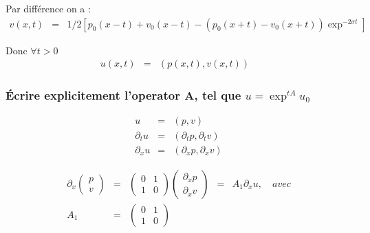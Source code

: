\documentclass[a4paper,11pt]{article}
\begin{document}
Par différence on a : 
\begin{equation*}
\begin{array}{rcll}
    v(x,t) &=& 1/2\left[p_{0}(x - t) + v_{0}(x - t) - (p_{0}(x + t) - v_{0}(x + t))\exp^{-2\sigma t} \right] &
\end{array}
\end{equation*}

Donc \( \forall t > 0 \)
\begin{equation*}
\begin{array}{rcll}
    u(x,t) &=& (p(x,t), v(x,t)) &
\end{array}
\end{equation*}


\subsubsection*{Écrire explicitement l'operator A, tel que \( u = \exp^{tA}u_{0} \)}

\begin{equation*}
\begin{array}{rcl}
    u &=& (p, v) \\
    \partial_{t}u &=& (\partial_{t}p,  \partial_{t}v) \\
    \partial_{x}u &=& (\partial_{x}p,  \partial_{x}v)
\end{array}
\end{equation*}

\begin{equation*}
\begin{array}{rclcl}
    \partial_{x}
    \begin{pmatrix}
        p \\
        v
    \end{pmatrix} &=&
    \begin{pmatrix}
        0 & 1 \\
        1 & 0
    \end{pmatrix}
    \begin{pmatrix}
        \partial_{x}p \\
        \partial_{x}v
    \end{pmatrix} &=&
    A_{1}\partial_{x}u, \quad avec \\
    A_{1} &=&
    \begin{pmatrix}
        0 & 1 \\
        1 & 0
    \end{pmatrix} & &
\end{array}
\end{equation*}
\end{document}
